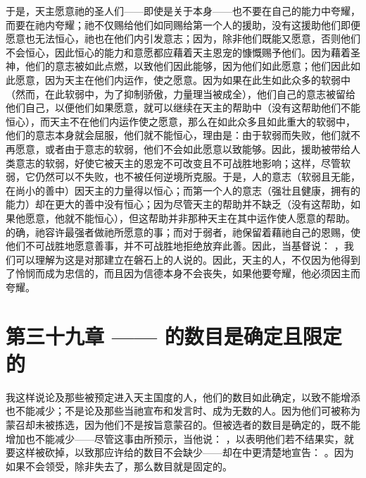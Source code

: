 于是，天主愿意祂的圣人们——即使是关于本身——也不要在自己的能力中夸耀，而要在祂内夸耀；祂不仅赐给他们如同赐给第一个人的援助，没有这援助他们即便愿意也无法恒心，祂也在他们内引发意志；因为，除非他们既能又愿意，否则他们不会恒心，因此恒心的能力和意愿都应藉着天主恩宠的慷慨赐予他们。因为藉着圣神，他们的意志被如此点燃，以致他们因此能够，因为他们如此愿意；他们因此如此愿意，因为天主在他们内运作，使之愿意。因为如果在此生如此众多的软弱中（然而，在此软弱中，为了抑制骄傲，力量理当被成全），他们自己的意志被留给他们自己，以便他们如果愿意，就可以继续在天主的帮助中（没有这帮助他们不能恒心），而天主不在他们内运作使之愿意，那么在如此众多且如此重大的软弱中，他们的意志本身就会屈服，他们就不能恒心，理由是：由于软弱而失败，他们就不再愿意，或者由于意志的软弱，他们不会如此愿意以致能够。因此，援助被带给人类意志的软弱，好使它被天主的恩宠不可改变且不可战胜地影响；这样，尽管软弱，它仍然可以不失败，也不被任何逆境所克服。于是，人的意志（软弱且无能，在尚小的善中）因天主的力量得以恒心；而第一个人的意志（强壮且健康，拥有的能力）却在更大的善中没有恒心；因为尽管天主的帮助并不缺乏（没有这帮助，如果他愿意，他就不能恒心），但这帮助并非那种天主在其中运作使人愿意的帮助。的确，祂容许最强者做祂所愿意的事；而对于弱者，祂保留着藉祂自己的恩赐，使他们不可战胜地愿意善事，并不可战胜地拒绝放弃此善。因此，当基督说： ，我们可以理解为这是对那建立在磐石上的人说的。因此，天主的人，不仅因为他得到了怜悯而成为忠信的，而且因为信德本身不会丧失，如果他要夸耀，他必须因主而夸耀。\par


\section{第三十九章 —— 的数目是确定且限定的}

我这样说论及那些被预定进入天主国度的人，他们的数目如此确定，以致不能增添也不能减少；不是论及那些当祂宣布和发言时、成为无数的人。因为他们可被称为蒙召却未被拣选，因为他们不是按旨意蒙召的。但被选者的数目是确定的，既不能增加也不能减少——尽管这事由所预示，当他说： ，以表明他们若不结果实，就要这样被砍掉，以致那应许给的数目不会缺少——却在中更清楚地宣告： 。因为如果不会领受，除非失去了，那么数目就是固定的。\par

